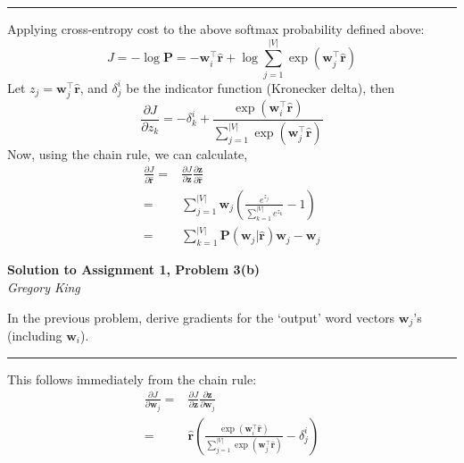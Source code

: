 \documentclass[letter,12pt]{article}
\newcommand{\myhwtitle}[3]
{\begin{center}
{\large {\bf Solution to Assignment {#1}, Problem {#2}}}\\
\medskip 
{\it {#3}} %
\end{center}}
\begin{document}
\noindent\rule{\textwidth}{0.4pt}\vspace{5mm}
Applying cross-entropy cost to the above softmax probability defined above:
\begin{equation}
J =-\log{\boldsymbol P} = - {\boldsymbol w}_{i}^{\top}\hat{\boldsymbol r} + \log\sum^{\vert{V}\vert}_{j=1}\exp{({\boldsymbol w}^{\top}_{j}\hat{\boldsymbol r})}
\end{equation}
Let $z_{j}={\boldsymbol w}_{j}^{\top}\hat{\boldsymbol r}$, and $\delta^{i}_{j}$ be the indicator function (Kronecker delta), then
\begin{equation}
\frac{\partial J}{\partial{z_{k}}} = - \delta^{i}_{k} + \frac{\exp{({\boldsymbol w}^{\top}_{i}\hat{\boldsymbol r})}}{\sum^{\vert{V}\vert}_{j=1}\exp{({\boldsymbol w}^{\top}_{j}\hat{\boldsymbol r})}}
\end{equation}
Now, using the chain rule, we can calculate,
\begin{align}
\frac{\partial J}{\partial{\hat{\boldsymbol r}}} =&\frac{\partial J}{\partial{{\boldsymbol z}}}\frac{\partial{{\boldsymbol z}}}{\partial{\hat{\boldsymbol r}}} \\
                                                                    =& \sum^{\vert{V}\vert}_{j=1} {\boldsymbol w}_{j}\left(\frac{e^{z_{j}}}{\sum^{\vert{V}\vert}_{k=1}e^{z_{k}}} -  1\right) \\
                                                                    =&\sum^{\vert{V}\vert}_{k=1}{\boldsymbol P}( {\boldsymbol w}_{j} \vert \hat{\boldsymbol r} ) {\boldsymbol w}_{j} -  {\boldsymbol w}_{j}
\end{align}

\clearpage
\myhwtitle{1}{3(b)}{Gregory King}
\bigskip
\noindent In the previous problem, derive gradients for the `output' word vectors ${\boldsymbol w}_{j}$'s (including ${\boldsymbol w}_{i}$).\vspace{5mm}

\noindent\rule{\textwidth}{0.4pt}\vspace{5mm}
This follows immediately from the chain rule:
\begin{align}
\frac{\partial J}{\partial{\boldsymbol w}_{j}} = &\frac{\partial J}{\partial{{\boldsymbol z}}}\frac{\partial{{\boldsymbol z}}}{\partial{\boldsymbol w}_{j}} \\
                                                                  = & \hat{\boldsymbol r}\left(\frac{\exp{({\boldsymbol w}^{\top}_{i}\hat{\boldsymbol r})}}{\sum^{\vert{V}\vert}_{j=1}\exp{({\boldsymbol w}^{\top}_{j}\hat{\boldsymbol r})}} - \delta^{i}_{j}\right)
\end{align}
\clearpage
\end{document}

